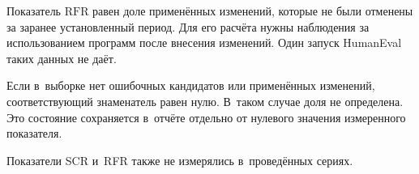 Показатель $\mathrm{RFR}$ равен доле применённых изменений, которые не были отменены за заранее установленный период. Для его расчёта нужны наблюдения за использованием программ после внесения изменений. Один запуск HumanEval таких данных не даёт.

Если в~выборке нет ошибочных кандидатов или применённых изменений, соответствующий знаменатель равен нулю. В~таком случае доля не определена. Это состояние сохраняется в~отчёте отдельно от нулевого значения измеренного показателя.


Показатели SCR и~RFR также не измерялись в~проведённых сериях.
